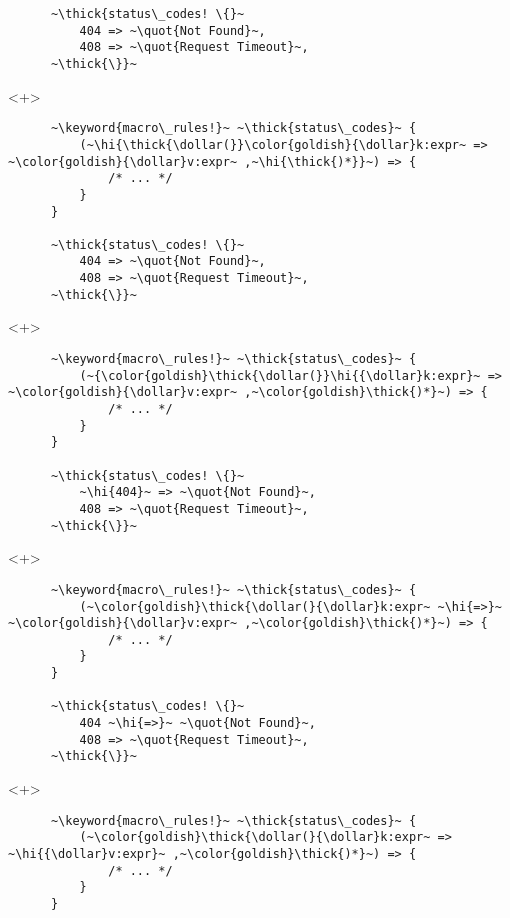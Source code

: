 \documentclass[usepdftitle=false,aspectratio=169]{beamer}
\newcommand{\dollar}{\makebox[\widthof{\$}][c]{\$}}
\newcommand{\thick}[1]{\contourlength{0.16pt}\contour[10]{black}{#1}}
\newcommand{\slantbox}[2][.5]
  {%
    \mbox
      {%
        \sbox{\foobox}{#2}%
        \hskip\wd\foobox
        \pdfsave
        \pdfsetmatrix{1 0 #1 1}%
        \llap{\usebox{\foobox}}%
        \pdfrestore
      }%
  }
\newcommand{\backslantbox}[2][.5]
  {%
    \mbox
      {%
        \sbox{\foobox}{#2}%
        \hskip\wd\foobox
        \pdfsave
        \pdfsetmatrix{-1 0 #1 1}%
        \llap{\usebox{\foobox}}%
        \pdfrestore
      }%
  }
\newcommand{\hi}[1]{%
\tikz[baseline=(A.base)]
 \node[highlighting=yellowbg,inner sep=0pt,text depth=0pt] (A) {#1};%
}
\newcommand{\openquote}{\backslantbox[.2]{\hspace{11pt}''\hspace{-11pt}}}
\newcommand{\closequote}{\slantbox[-.2]{\hspace{2pt}''\hspace{-2pt}}}
\newcommand{\blackquote}[1]{\openquote#1\closequote}
\newcommand{\quot}[1]{{\color{redish}\blackquote{#1}}}
\newcommand{\keyword}[1]{\color{greenish}#1}
\begin{document}
\begin{frame}[fragile]
\begin{onlyenv}
\begin{verbatim}
      ~\thick{status\_codes! \{}~
          404 => ~\quot{Not Found}~,
          408 => ~\quot{Request Timeout}~,
      ~\thick{\}}~
    \end{verbatim}
  \end{onlyenv}
  \begin{onlyenv}<+>
    \begin{verbatim}
      ~\keyword{macro\_rules!}~ ~\thick{status\_codes}~ {
          (~\hi{\thick{\dollar(}}\color{goldish}{\dollar}k:expr~ => ~\color{goldish}{\dollar}v:expr~ ,~\hi{\thick{)*}}~) => {
              /* ... */
          }
      }

      ~\thick{status\_codes! \{}~
          404 => ~\quot{Not Found}~,
          408 => ~\quot{Request Timeout}~,
      ~\thick{\}}~
    \end{verbatim}
  \end{onlyenv}
  \begin{onlyenv}<+>
    \begin{verbatim}
      ~\keyword{macro\_rules!}~ ~\thick{status\_codes}~ {
          (~{\color{goldish}\thick{\dollar(}}\hi{{\dollar}k:expr}~ => ~\color{goldish}{\dollar}v:expr~ ,~\color{goldish}\thick{)*}~) => {
              /* ... */
          }
      }

      ~\thick{status\_codes! \{}~
          ~\hi{404}~ => ~\quot{Not Found}~,
          408 => ~\quot{Request Timeout}~,
      ~\thick{\}}~
    \end{verbatim}
  \end{onlyenv}
  \begin{onlyenv}<+>
    \begin{verbatim}
      ~\keyword{macro\_rules!}~ ~\thick{status\_codes}~ {
          (~\color{goldish}\thick{\dollar(}{\dollar}k:expr~ ~\hi{=>}~ ~\color{goldish}{\dollar}v:expr~ ,~\color{goldish}\thick{)*}~) => {
              /* ... */
          }
      }

      ~\thick{status\_codes! \{}~
          404 ~\hi{=>}~ ~\quot{Not Found}~,
          408 => ~\quot{Request Timeout}~,
      ~\thick{\}}~
    \end{verbatim}
  \end{onlyenv}
  \begin{onlyenv}<+>
    \begin{verbatim}
      ~\keyword{macro\_rules!}~ ~\thick{status\_codes}~ {
          (~\color{goldish}\thick{\dollar(}{\dollar}k:expr~ => ~\hi{{\dollar}v:expr}~ ,~\color{goldish}\thick{)*}~) => {
              /* ... */
          }
      }


\end{verbatim}
\end{onlyenv}
\end{frame}
\end{document}
